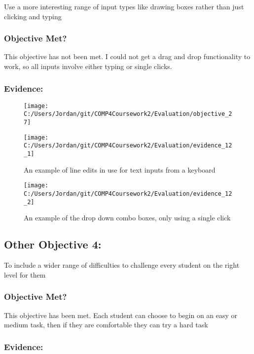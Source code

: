 Use a more interesting range of input types like drawing boxes rather than just clicking and typing

\subsubsection{Objective Met?}

This objective has not been met. I could not get a drag and drop functionality to work, so all inputs involve either typing or single clicks.

\subsubsection{Evidence: }

\begin{figure}[H]
	\texttt{[image: C:/Users/Jordan/git/COMP4Coursework2/Evaluation/objective\_27]}
\end{figure}

\begin{figure}[H]
	\texttt{[image: C:/Users/Jordan/git/COMP4Coursework2/Evaluation/evidence\_12\_1]}
	\caption{An example of line edits in use for text inputs from a keyboard}
\end{figure}

\begin{figure}[H]
	\texttt{[image: C:/Users/Jordan/git/COMP4Coursework2/Evaluation/evidence\_12\_2]}
	\caption{An example of the drop down combo boxes, only using a single click}
\end{figure}

\subsection{Other Objective 4: }

To include a wider range of difficulties to challenge every student on the right level for them

\subsubsection{Objective Met?}

This objective has been met. Each student can choose to begin on an easy or medium task, then if they are comfortable they can try a hard task

\subsubsection{Evidence: }

